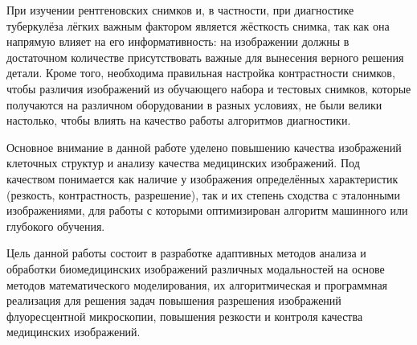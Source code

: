 При изучении рентгеновских снимков и, в частности, при диагностике туберкулёза лёгких важным фактором является жёсткость снимка, так как она напрямую влияет на его информативность: на изображении должны в достаточном количестве присутствовать важные для вынесения верного решения детали. Кроме того, необходима правильная настройка контрастности снимков, чтобы различия изображений из обучающего набора и тестовых снимков, которые получаются на различном оборудовании в разных условиях, не были велики настолько, чтобы влиять на качество работы алгоритмов диагностики.

Основное внимание в данной работе уделено повышению качества изображений клеточных структур и анализу качества медицинских изображений. Под качеством понимается как наличие у изображения определённых характеристик (резкость, контрастность, разрешение), так и их степень сходства с эталонными изображениями, для работы с которыми оптимизирован алгоритм машинного или глубокого обучения.




{\aim}

Цель данной работы состоит в разработке адаптивных методов анализа и обработки биомедицинских изображений различных модальностей на основе методов математического моделирования, их алгоритмическая и программная реализация для решения задач повышения разрешения изображений флуоресцентной микроскопии, повышения резкости и контроля качества медицинских изображений.


{\novelty}

